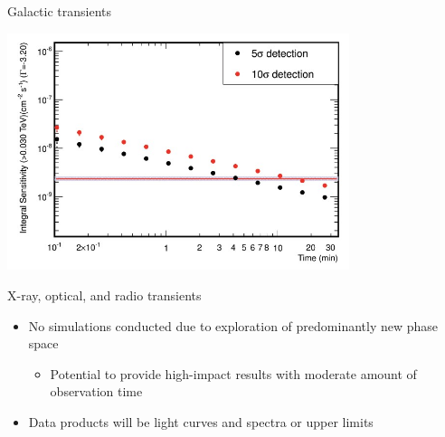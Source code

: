 \begin{frame}{Galactic transients}
\begin{overprint}
\begin{minipage}{0.48\textwidth}
{      }
    \end{minipage}
    \begin{minipage}{0.48\textwidth}
       \includegraphics[width=0.75\textwidth]{Plots/cyg1-sens.png}
    \end{minipage}
  \end{overprint}
\end{frame}

\begin{frame}{X-ray, optical, and radio transients}
  \begin{itemize}
    \item No simulations conducted due to exploration of predominantly new phase space
    \begin{itemize}
      \item [\to] Potential to provide high-impact results with moderate amount of observation time
    \end{itemize}
    \item Data products will be light curves and spectra or upper limits
  \end{itemize}
\end{frame}

